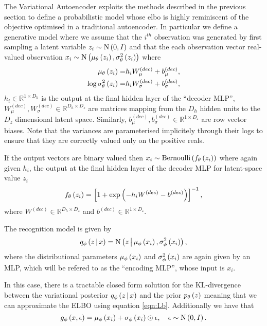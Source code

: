 \documentclass[../report.tex]{subfiles}
\begin{document}
The Variational Autoencoder exploits the methods described in the previous section to define a probabilistic model whose elbo is highly reminiscent of the objective optimised in a traditional autoencoder. In particular we define a generative model where we assume that the $i^{th}$ observation was generated by first sampling a latent variable $z_i \sim \textrm{N} \left( 0, I\right)$ and that the each observation vector real-valued observation $x_i \sim \textrm{N} \left( \mu_\theta \left( z_i\right), \sigma^2_\theta \left( z_i\right)\right)$ where
\begin{align}
  \mu_\theta \left( z_i\right) =& h_i W_\mu^{(dec)} + b_\mu^{(dec)}, \\
  \log \sigma^2_\theta \left( z_i\right) =& h_i W_\sigma^{(dec)} + b_\sigma^{(dec)},
\end{align}
$h_i \in \mathbb{R}^{1 \times D_h}$ is the output at the final hidden layer of the ``decoder MLP'', $W_\mu^{(dec)}, W_\sigma^{(dec)} \in \mathbb{R}^{D_h \times D_z}$ are matrices mapping from the $D_h$ hidden units to the $D_z$ dimensional latent space. Similarly, $b_\mu^{(dec)}, b_\sigma^{(dec)} \in \mathbb{R}^{1 \times D_z}$ are row vector biases. Note that the variances are parameterised implicitely through their logs to ensure that they are correctly valued only on the positive reals.

If the output vectors are binary valued then $x_i \sim \textrm{Bernoulli} \left( f_\theta \left( z_i\right)\right)$ where again given $h_i$, the output at the final hidden layer of the decoder MLP for latent-space value $z_i$
\begin{equation}
  f_\theta \left( z_i\right) = \left[1 + \exp \left( - h_i W^{(dec)} - b^{(dec)}\right) \right]^{-1},
\end{equation}
where $W^{(dec)} \in \mathbb{R}^{D_h \times D_z}$ and $b^{(dec)} \in \mathbb{R}^{1 \times D_z}$.

The recognition model is given by
\begin{equation}
  q_\phi \left(z \, \middle\vert \, x \right) = \textrm{N} \left(z \, \middle\vert \, \mu_\phi \left( x_i\right), \sigma_\phi^2 \left( x_i\right) \right),
\end{equation}
where the distributional parameters $\mu_\phi \left( x_i\right)$ and $\sigma_\phi^2 \left( x_i\right)$ are again given by an MLP, which will be refered to as the ``encoding MLP'', whose input is $x_i$.

In this case, there is a tractable closed form solution for the KL-divergence between the variational posterior $q_\phi \left(z \, \middle\vert \, x \right)$ and the prior $p_\theta \left( z\right)$ meaning that we can approximate the ELBO using equation \ref{eqn:Lb}. Additionally we have that
\begin{equation}
  g_\phi \left( x, \epsilon\right) = \mu_\phi \left( x_i\right) + \sigma_\phi \left( x_i\right) \odot \epsilon, \quad \epsilon \sim \textrm{N} \left( 0, I\right).
\end{equation}
\end{document}
